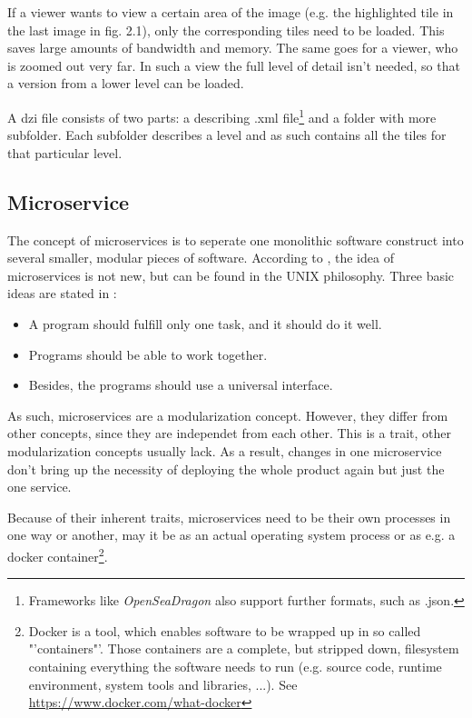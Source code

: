 If a viewer wants to view a certain area of the image (e.g. the highlighted tile in the last image in fig. 2.1), only the corresponding tiles need to be loaded. This saves large amounts of bandwidth and memory. The same goes for a viewer, who is zoomed out very far. In such a view the full level of detail isn't needed, so that a version from a lower level can be loaded.

A dzi file consists of two parts: a describing .xml file\footnote{Frameworks like \emph{OpenSeaDragon} also support further formats, such as .json.} and a folder with more subfolder. Each subfolder describes a level and as such contains all the tiles for that particular level.


\subsection{Microservice}

The concept of microservices is to seperate one monolithic software construct into several smaller, modular pieces of software. According to \cite{Wolff16}, the idea of microservices is not new, but can be found in the UNIX philosophy. Three basic ideas are stated in \cite{Wolff16}:

\begin{itemize}
	\item A program should fulfill only one task, and it should do it well.
	\item Programs should be able to work together.
	\item Besides, the programs should use a universal interface.
\end{itemize}

As such, microservices are a modularization concept. However, they differ from other concepts, since they are independet from each other. This is a trait, other modularization concepts usually lack. As a result, changes in one microservice don't bring up the necessity of deploying the whole product again but just the one service.

Because of their inherent traits, microservices need to be their own processes in one way or another, may it be as an actual operating system process or as e.g. a docker container\footnote{Docker is a tool, which enables software to be wrapped up in so called "'containers"'. Those containers are a complete, but stripped down, filesystem containing everything the software needs to run (e.g. source code, runtime environment, system tools and libraries, ...). See \url{https://www.docker.com/what-docker}}.


